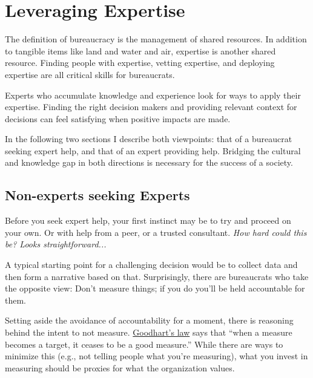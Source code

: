 \section{Leveraging Expertise\label{sec:expertise}}



The definition of \gls{bureaucracy} is the management of shared resources. In addition to tangible items like land and water and air, expertise is another shared resource. Finding people with expertise, vetting expertise, and deploying expertise are all critical skills for bureaucrats. 

Experts who accumulate knowledge and experience look for ways to apply their expertise. Finding the right decision makers and providing relevant context for decisions can feel satisfying when positive impacts are made. 


In the following two sections I describe both viewpoints: that of a bureaucrat seeking expert help, and that of an expert providing help. Bridging the cultural and knowledge gap in both directions is necessary for the success of a society.

\subsection*{Non-experts seeking Experts}

Before you seek expert help, your first instinct may be to try and proceed on your own. Or with help from a peer, or a trusted consultant. \textit{How hard could this be? Looks straightforward...}

A typical starting point for a challenging decision would be to collect data and then form a narrative based on that. Surprisingly, there are bureaucrats who take the opposite view: Don't measure things; if you do you'll be held accountable for them. 

Setting aside the avoidance of accountability for a moment, there is reasoning behind the intent to not measure.  \href{https://en.wikipedia.org/wiki/Goodhart\%27s_law}{Goodhart's law}
says that ``when a measure becomes a target, it ceases to be a good measure.'' While there are ways to minimize this (e.g., not telling people what you're measuring), what you invest in measuring should be proxies for what the organization values.

